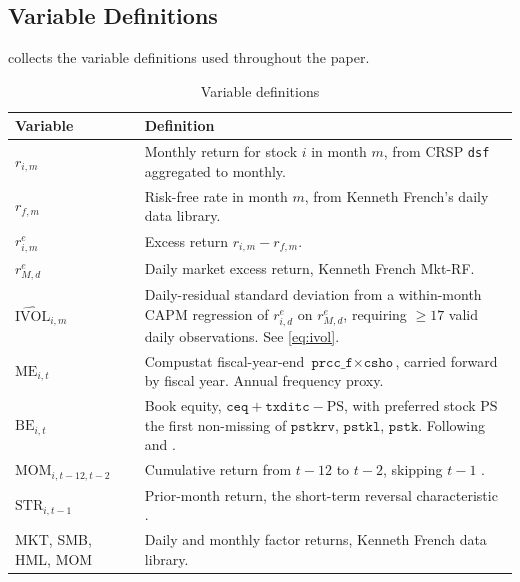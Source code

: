\documentclass[12pt]{article}
\newcommand{\1}[1]{\mathds{1}\left[#1\right]}
\begin{document}
\clearpage
\begin{appendices}

\section{Variable Definitions}\label{app:variables}

 collects the variable definitions used throughout the
paper.

\begin{table}[H]
\centering
\begin{threeparttable}
\caption{Variable definitions}\label{tab:varlist}
\small
\begin{tabular}{p{}p{}}
\toprule
Variable & Definition \\
\midrule
$r_{i,m}$ & Monthly return for stock $i$ in month $m$, from CRSP \texttt{dsf} aggregated to monthly. \\
$r_{f,m}$ & Risk-free rate in month $m$, from Kenneth French's daily data library. \\
$r^e_{i,m}$ & Excess return $r_{i,m} - r_{f,m}$. \\
$r^e_{M,d}$ & Daily market excess return, Kenneth French Mkt-RF. \\
$\widehat{\mathrm{IVOL}}_{i,m}$ & Daily-residual standard deviation from a within-month CAPM regression of $r^e_{i,d}$ on $r^e_{M,d}$, requiring $\ge 17$ valid daily observations. See \eqref{eq:ivol}. \\
$\mathrm{ME}_{i,t}$ & Compustat fiscal-year-end $\texttt{prcc\_f} \times \texttt{csho}$, carried forward by fiscal year. Annual frequency proxy. \\
$\mathrm{BE}_{i,t}$ & Book equity, $\texttt{ceq} + \texttt{txditc} - \mathrm{PS}$, with preferred stock $\mathrm{PS}$ the first non-missing of $\texttt{pstkrv}$, $\texttt{pstkl}$, $\texttt{pstk}$. Following \citet{fama1993common} and \citet{davis2000characteristics}. \\
$\mathrm{MOM}_{i,t-12,t-2}$ & Cumulative return from $t{-}12$ to $t{-}2$, skipping $t{-}1$ \citep{jegadeesh1993returns}. \\
$\mathrm{STR}_{i,t-1}$ & Prior-month return, the short-term reversal characteristic \citep{huang2010return}. \\
MKT, SMB, HML, MOM & Daily and monthly factor returns, Kenneth French data library. \\

\end{tabular}
\end{threeparttable}
\end{table}
\end{appendices}
\end{document}
